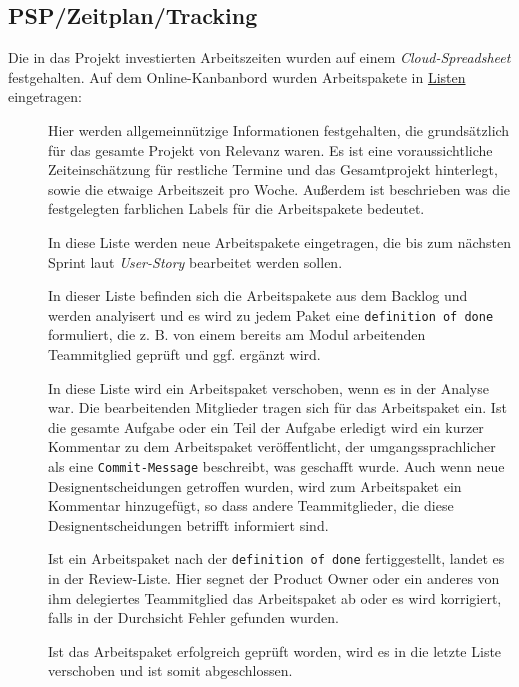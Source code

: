 \documentclass[
   draft=false
  ,paper=a4
  ,twoside=true
  ,fontsize=11pt
  ,headsepline
  ,DIV11
  ,parskip=full+
]{scrartcl} %
\begin{document}
\subsection{PSP/Zeitplan/Tracking}
Die in das Projekt investierten Arbeitszeiten wurden auf einem \emph{Cloud-Spreadsheet} festgehalten. \newline
Auf dem Online-Kanbanbord wurden Arbeitspakete in \underline{Listen} eingetragen:
\begin{description}
\item[] 
Hier werden allgemeinnützige Informationen festgehalten, die grundsätzlich für das gesamte Projekt von Relevanz waren. \newline
Es ist eine voraussichtliche Zeiteinschätzung für restliche Termine und das Gesamtprojekt hinterlegt, sowie die etwaige Arbeitszeit pro Woche. \newline
Außerdem ist beschrieben was die festgelegten farblichen Labels für die Arbeitspakete bedeutet.
\item[] In diese Liste werden neue Arbeitspakete eingetragen, die bis zum nächsten Sprint laut \emph{User-Story} bearbeitet werden sollen.
\item[] In dieser Liste befinden sich die Arbeitspakete aus dem Backlog und werden analyisert und es wird zu jedem Paket eine \texttt{definition of done} formuliert, die z. B. von einem bereits am Modul arbeitenden Teammitglied geprüft und ggf. ergänzt wird.
\item[] In diese Liste wird ein Arbeitspaket verschoben, wenn es in der Analyse war. Die bearbeitenden Mitglieder tragen sich für das Arbeitspaket ein. Ist die gesamte Aufgabe oder ein Teil der Aufgabe erledigt wird ein kurzer Kommentar zu dem Arbeitspaket veröffentlicht, der umgangssprachlicher als eine \texttt{Commit-Message} beschreibt, was geschafft wurde. Auch wenn neue Designentscheidungen getroffen wurden, wird zum Arbeitspaket ein Kommentar hinzugefügt, so dass andere Teammitglieder, die diese Designentscheidungen betrifft informiert sind.

\item[] Ist ein Arbeitspaket nach der \texttt{definition of done} fertiggestellt, landet es in der Review-Liste. Hier segnet der Product Owner oder ein anderes von ihm delegiertes Teammitglied das Arbeitspaket ab oder es wird korrigiert, falls in der Durchsicht Fehler gefunden wurden.

\item[] Ist das Arbeitspaket erfolgreich geprüft worden, wird es in die letzte Liste verschoben und ist somit abgeschlossen.

\end{description}
\end{document}

